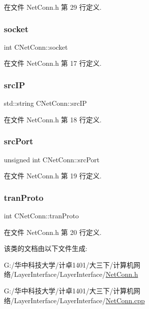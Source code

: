 在文件 Net\+Conn.\+h 第 29 行定义.

\mbox{\label{class_c_net_conn_a622ed64d7d62629e8ac33b1d2d0c70bc}} 
\subsubsection{\texorpdfstring{socket}{socket}}
{\footnotesize\ttfamily int C\+Net\+Conn\+::socket}



在文件 Net\+Conn.\+h 第 17 行定义.

\mbox{\label{class_c_net_conn_ab811fe46f1f54064735438c119df692e}} 
\subsubsection{\texorpdfstring{src\+IP}{srcIP}}
{\footnotesize\ttfamily std\+::string C\+Net\+Conn\+::src\+IP}



在文件 Net\+Conn.\+h 第 18 行定义.

\mbox{\label{class_c_net_conn_a01763de4d43bf8f45022ad549141ec2b}} 
\subsubsection{\texorpdfstring{src\+Port}{srcPort}}
{\footnotesize\ttfamily unsigned int C\+Net\+Conn\+::src\+Port}



在文件 Net\+Conn.\+h 第 19 行定义.

\mbox{\label{class_c_net_conn_a887c118d2000cf8bd230a8f09579b7b7}} 
\subsubsection{\texorpdfstring{tran\+Proto}{tranProto}}
{\footnotesize\ttfamily int C\+Net\+Conn\+::tran\+Proto}



在文件 Net\+Conn.\+h 第 20 行定义.



该类的文档由以下文件生成\+:\begin{DoxyCompactItemize}
\item 
G\+:/华中科技大学/计卓1401/大三下/计算机网络/\+Layer\+Interface/\+Layer\+Interface/\hyperlink{_layer_interface_2_net_conn_8h}{Net\+Conn.\+h}\item 
G\+:/华中科技大学/计卓1401/大三下/计算机网络/\+Layer\+Interface/\+Layer\+Interface/\hyperlink{_layer_interface_2_net_conn_8cpp}{Net\+Conn.\+cpp}\end{DoxyCompactItemize}
